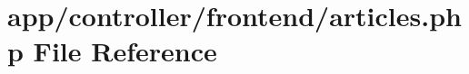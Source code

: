 \hypertarget{articles_8php}{\section{app/controller/frontend/articles.php File Reference}
\label{articles_8php}
}

